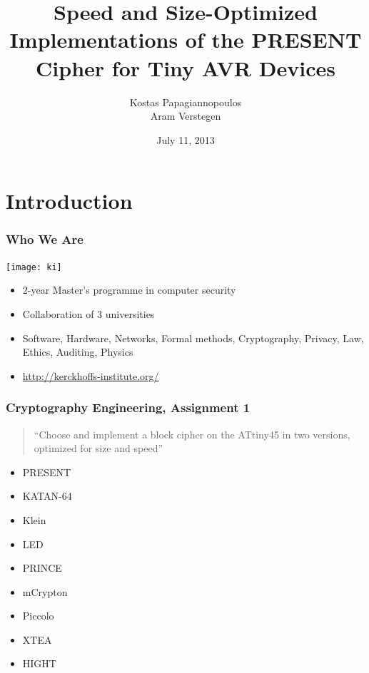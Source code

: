 \documentclass{beamer}
\title[Speed and Size-Optimized PRESENT for AVR]{Speed and Size-Optimized Implementations of the PRESENT Cipher for Tiny AVR Devices}
\author[Papagiannopoulos and Verstegen]{
Kostas Papagiannopoulos \\
Aram Verstegen
}
\date{July 11, 2013}
\begin{document}
\frame{\titlepage}

\section{Introduction}
\begin{frame}[fragile]
\frametitle{Who We Are}
\texttt{[image: ki]}
\begin{itemize}
\item 2-year Master's programme in computer security
\item Collaboration of 3 universities
\item Software, Hardware, Networks, Formal methods, Cryptography, Privacy, Law, Ethics, Auditing, Physics
\item \url{http://kerckhoffs-institute.org/}
\end{itemize}
\end{frame}

\begin{frame}[fragile]
\frametitle{Cryptography Engineering, Assignment 1}
\begin{quote}
``Choose and implement a block cipher on the ATtiny45 in two versions, optimized for size and speed''
\end{quote}

\begin{itemize}
\item PRESENT
\item KATAN-64
\item Klein
\item LED
\item PRINCE
\item mCrypton
\item Piccolo
\item XTEA
\item HIGHT
\end{itemize}
\end{frame}

\end{document}
